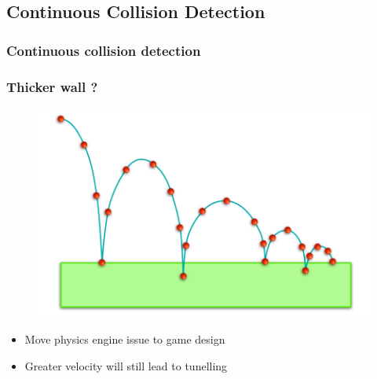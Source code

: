 \documentclass{beamer}
\begin{document}
\subsection{Continuous Collision Detection}
\begin{frame}
  \frametitle{Continuous collision detection}

  \begin{figure}[p]
    \centering
  \end{figure}
\end{frame}

\begin{frame}
  \frametitle{Thicker wall ?}
  \begin{figure}[p]
    \centering
    \includegraphics[width=0.7\linewidth]{ccd3}
  \end{figure}
  \begin{itemize}
  \item Move physics engine issue to game design
  \item Greater velocity will still lead to tunelling
  \end{itemize}
  
\end{frame}
\end{document}
